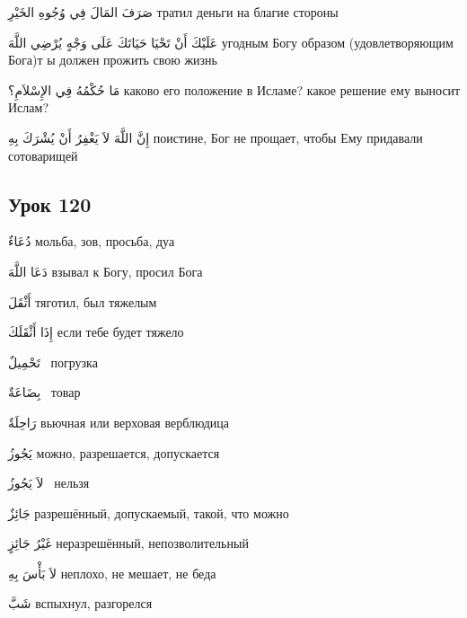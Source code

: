 \documentclass[a5paper]{article}
\newcommand\textstyleDropCaps[1]{#1}
\newcommand\textstyleCaptioncharacters[1]{#1}
\begin{document}
\textstyleCaptioncharacters{صَرَفَ المَالَ فِي وُجُوهِ الخَيْرِ }\textstyleDropCaps{тратил деньги на благие стороны ‎}

\textstyleCaptioncharacters{عَلَيْكَ أَنْ تَحْيَا حَيَاتَكَ عَلَى وَجْهٍ يُرْضِي اللَّهَ }\textstyleDropCaps{угодным Богу образом (удовлетворяющим Бога)т ы должен прожить свою жизнь ‎}

\textstyleCaptioncharacters{مَا حُكْمُهُ فِي الإِسْلاَمِ؟ }\textstyleDropCaps{каково его положение в Исламе? какое решение ему выносит Ислам?‎}

\textstyleCaptioncharacters{إِنَّ اللَّهَ لاَ يَغْفِرُ أَنْ يُشْرَكَ بِهِ }\textstyleDropCaps{поистине, Бог не прощает, чтобы Ему придавали сотоварищей‎}

\subsection[Урок 120‎]{\textstyleDropCaps{Урок 120‎}}
\textstyleCaptioncharacters{دُعَاءٌ }\textstyleDropCaps{мольба, зов, просьба, дуа‎}

\textstyleCaptioncharacters{دَعَا اللَّهَ }\textstyleDropCaps{взывал к Богу, просил Бога‎}

\textstyleCaptioncharacters{أَثْقَلَ }\textstyleDropCaps{тяготил, был тяже­лым‎}

\textstyleCaptioncharacters{إِذَا أَثْقَلَكَ }\textstyleDropCaps{если тебе будет тяжело‎}

\textstyleCaptioncharacters{تَحْمِيلٌ \ }\textstyleDropCaps{погрузка‎}

\textstyleCaptioncharacters{بِضَاعَةٌ \ }\textstyleDropCaps{товар ‎}

\textstyleCaptioncharacters{رَاحِلَةٌ }\textstyleDropCaps{вьючная или верхо­вая верблюдица‎}

\textstyleCaptioncharacters{يَجُوزُ }\textstyleDropCaps{можно, разрешает­ся, допускается‎}

\textstyleCaptioncharacters{لاَ يَجُوزُ \ }\textstyleDropCaps{нельзя ‎}

\textstyleCaptioncharacters{جَائِزٌ }\textstyleDropCaps{разрешённый, допус­каемый, такой, что можно‎}

\textstyleCaptioncharacters{غَيْرُ جَائِزٍ }\textstyleDropCaps{неразрешён­ный, непозволительный‎}

\textstyleCaptioncharacters{لاَ بَأْسَ بِهِ }\textstyleDropCaps{неплохо, не мешает, не беда‎}

\textstyleCaptioncharacters{شَبَّ }\textstyleDropCaps{вспыхнул, разгорелся‎}
\end{document}
